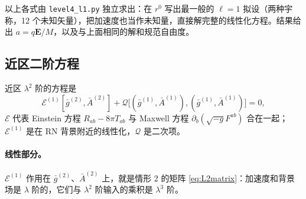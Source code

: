 \documentclass[11pt,a4paper]{ctexart}
\numberwithin{equation}{section}
\begin{document}
以上各式由 \texttt{level4\_l1.py} 独立求出：在 $r^0$ 写出最一般的 $\ell=1$ 拟设（两种宇称，12 个未知矢量），把加速度也当作未知量，直接解完整的线性化方程。结果给出 $a=q\boldsymbol E/M$，以及与上面相同的解和规范自由度。

\subsection{近区二阶方程}
\label{sec:L4second}

近区 $\lambda^2$ 阶的方程是
\begin{equation}
\mathcal E^{(1)}[\bar g^{(2)},\bar A^{(2)}]+\mathcal Q\big[(\bar g^{(1)},\bar A^{(1)}),(\bar g^{(1)},\bar A^{(1)})\big]=0 ,
\label{eq:L4second}
\end{equation}
$\mathcal E$ 代表 Einstein 方程 $R_{ab}-8\pi T_{ab}$ 与 Maxwell 方程 $\partial_b(\sqrt{-g}F^{ab})$ 合在一起；$\mathcal E^{(1)}$ 是在 RN 背景附近的线性化，$\mathcal Q$ 是二次项。

\paragraph{线性部分。}$\mathcal E^{(1)}$ 作用在 $\bar g^{(2)}$、$\bar A^{(2)}$ 上，就是情形 2 的矩阵 \eqref{eq:L2matrix}：加速度和背景场是 $\lambda$ 阶的，它们与 $\lambda^2$ 阶输入的乘积是 $\lambda^3$ 阶。
\end{document}
